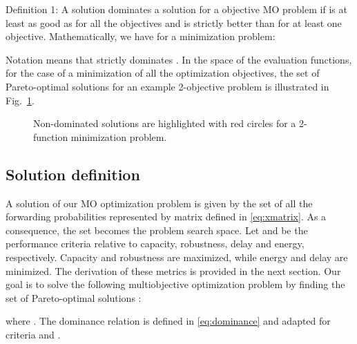 \documentclass[a4paper]{article}
\begin{document}
{\sc Definition 1:} A solution  dominates a solution  for a objective MO problem if  is at least as good as  for all the objectives and  is strictly better than  for at least one objective. Mathematically, we have for a minimization problem:

\noindent Notation  means that  strictly dominates .
In the space of the evaluation functions, for the case of a minimization of all the optimization objectives, the set of Pareto-optimal solutions for an example 2-objective problem is illustrated in Fig.~\ref{fig:dominance}.

\begin{figure}
\begin{center}
\caption{Non-dominated solutions are highlighted with red circles for a 2-function minimization problem.}
\label{fig:dominance}
\end{center}
\end{figure}

\subsection{Solution definition}
A solution of our MO optimization problem is given by the set of all the forwarding probabilities represented by matrix  defined in \eqref{eq:xmatrix}. As a consequence, the set  becomes the problem search space. 
Let   and  be the performance criteria relative to capacity, robustness, delay and energy, respectively. Capacity and robustness are maximized, while energy and delay are minimized. The derivation of these metrics is provided in the next section. 
Our goal is to solve the following multiobjective optimization problem by finding the set of Pareto-optimal solutions :

\noindent where . The dominance relation is defined in \eqref{eq:dominance} and adapted for criteria  and .
\end{document}
